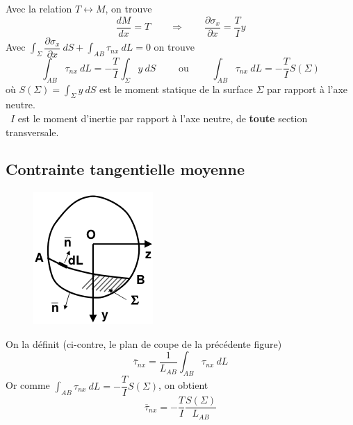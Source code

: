 	Avec la relation $T\leftrightarrow M$, on trouve 
	\begin{equation}
	\dfrac{dM}{dx}= T\qquad\Longrightarrow\qquad \dfrac{\partial\sigma_x}{\partial x}
	=\dfrac{T}{I}y
	\end{equation}
	Avec $\int_\Sigma \dfrac{\partial \sigma_x}{\partial x}\ dS + \int_{AB}\tau_{nx}\ 
	dL=0$ on trouve
	\begin{equation}
	\int_{AB}\tau_{nx}\ dL = -\dfrac{T}{I}\int_\Sigma y\ dS\qquad\text{ ou }\qquad 
	\int_{AB} \tau_{nx}\ dL = -\dfrac{T}{I}S(\Sigma)
	\end{equation}
	où $S(\Sigma) = \int_\Sigma y\ dS$ est le moment statique de la surface $\Sigma$ 
	par rapport à l'axe neutre.\\
	\danger\  $I$ est le moment d'inertie par rapport à l'axe neutre, de \textbf{toute} 
	section transversale.
	
	\subsection{Contrainte tangentielle moyenne}
	\begin{figure}
	\vspace{-7mm}
	\includegraphics[scale=0.4]{ch5/image4.png}
	\end{figure}
	On la définit (ci-contre, le plan de coupe de la précédente figure)
	\begin{equation}
	\overline{\tau}_{nx} = \dfrac{1}{L_{AB}}\int_{AB}\tau_{nx}\ dL
	\end{equation}
	Or comme $\int_{AB} \tau_{nx}\ dL = -\dfrac{T}{I}S(\Sigma)$, on obtient 
	\begin{equation}
	\overline{\tau}_{nx} = -\dfrac{T}{I}\dfrac{S(\Sigma)}{L_{AB}}
	\end{equation}
	\newpage
	
